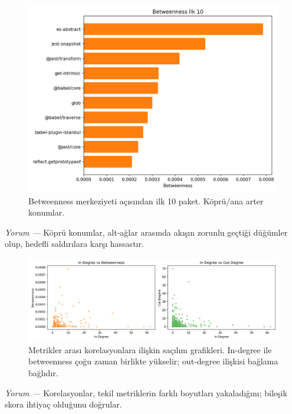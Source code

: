 \documentclass[11pt,a4paper]{article}
\begin{document}
\begin{figure}[H]
  \centering
  \includegraphics{top10_betweenness.png}
  \caption{Betweenness merkeziyeti açısından ilk 10 paket. Köprü/ana arter konumlar.}
\end{figure}
\textit{Yorum —} Köprü konumlar, alt-ağlar arasında akışın zorunlu geçtiği düğümler olup, hedefli saldırılara karşı hassastır.

\begin{figure}[H]
  \centering
  \includegraphics{scatter_correlations.png}
  \caption{Metrikler arası korelasyonlara ilişkin saçılım grafikleri. In-degree ile betweenness çoğu zaman birlikte yükselir; out-degree ilişkisi bağlama bağlıdır.}
\end{figure}
\textit{Yorum —} Korelasyonlar, tekil metriklerin farklı boyutları yakaladığını; bileşik skora ihtiyaç olduğunu doğrular.
\end{document}
